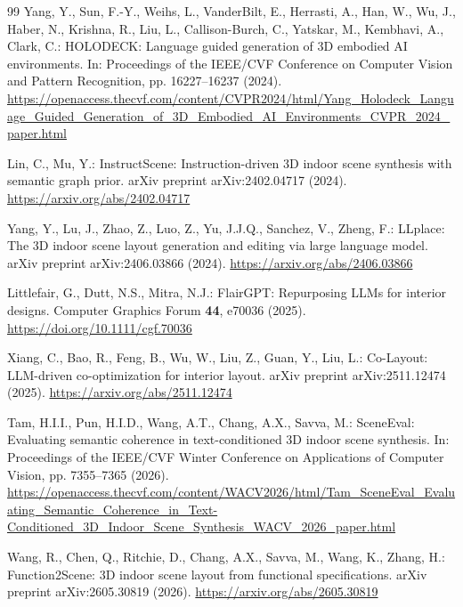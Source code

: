 \documentclass[pdflatex,sn-mathphys-num]{sn-jnl}
\begin{document}
\begin{thebibliography}{99}
Yang, Y., Sun, F.-Y., Weihs, L., VanderBilt, E., Herrasti, A., Han, W.,
Wu, J., Haber, N., Krishna, R., Liu, L., Callison-Burch, C., Yatskar, M.,
Kembhavi, A., Clark, C.:
HOLODECK: Language guided generation of 3D embodied AI environments.
In: Proceedings of the IEEE/CVF Conference on Computer Vision and Pattern
Recognition, pp. 16227--16237 (2024).
\url{https://openaccess.thecvf.com/content/CVPR2024/html/Yang_Holodeck_Language_Guided_Generation_of_3D_Embodied_AI_Environments_CVPR_2024_paper.html}

Lin, C., Mu, Y.:
InstructScene: Instruction-driven 3D indoor scene synthesis with semantic
graph prior. arXiv preprint arXiv:2402.04717 (2024).
\url{https://arxiv.org/abs/2402.04717}

Yang, Y., Lu, J., Zhao, Z., Luo, Z., Yu, J.J.Q., Sanchez, V., Zheng, F.:
LLplace: The 3D indoor scene layout generation and editing via large language
model. arXiv preprint arXiv:2406.03866 (2024).
\url{https://arxiv.org/abs/2406.03866}

Littlefair, G., Dutt, N.S., Mitra, N.J.:
FlairGPT: Repurposing LLMs for interior designs.
Computer Graphics Forum \textbf{44}, e70036 (2025).
\url{https://doi.org/10.1111/cgf.70036}

Xiang, C., Bao, R., Feng, B., Wu, W., Liu, Z., Guan, Y., Liu, L.:
Co-Layout: LLM-driven co-optimization for interior layout.
arXiv preprint arXiv:2511.12474 (2025).
\url{https://arxiv.org/abs/2511.12474}

Tam, H.I.I., Pun, H.I.D., Wang, A.T., Chang, A.X., Savva, M.:
SceneEval: Evaluating semantic coherence in text-conditioned 3D indoor scene
synthesis. In: Proceedings of the IEEE/CVF Winter Conference on Applications
of Computer Vision, pp. 7355--7365 (2026).
\url{https://openaccess.thecvf.com/content/WACV2026/html/Tam_SceneEval_Evaluating_Semantic_Coherence_in_Text-Conditioned_3D_Indoor_Scene_Synthesis_WACV_2026_paper.html}

Wang, R., Chen, Q., Ritchie, D., Chang, A.X., Savva, M., Wang, K., Zhang, H.:
Function2Scene: 3D indoor scene layout from functional specifications.
arXiv preprint arXiv:2605.30819 (2026).
\url{https://arxiv.org/abs/2605.30819}

\end{thebibliography}
\end{document}
